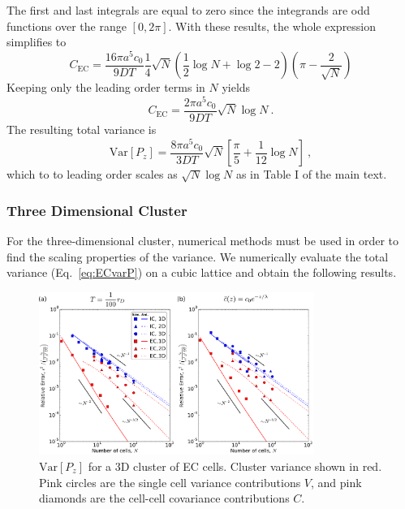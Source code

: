 The first and last integrals are equal to zero since the integrands are odd functions over the range $[0,2\pi]$. With these results, the whole expression simplifies to
\begin{equation}
    C_\text{EC} = \frac{16\pi a^5c_0}{9DT} \frac{1}{4}\sqrt{N} \left( \frac{1}{2}\log N + \log 2 -2 \right) \left( \pi - \frac{2}{\sqrt{N}} \right)
\end{equation}
Keeping only the leading order terms in $N$ yields
\begin{equation}
    C_\text{EC} = \frac{2\pi a^5c_0}{9DT} \sqrt{N} \log N \ .
\end{equation}
The resulting total variance is
\begin{equation}
    \text{Var}[P_z] = \frac{8\pi a^5c_0}{3DT} \sqrt{N} \left[ \frac{\pi}{5} +  \frac{1}{12} \log N \right] \ ,
\end{equation}
which to to leading order scales as $\sqrt{N} \log N$ as in Table I of the main text.


\subsubsection{Three Dimensional Cluster}

For the three-dimensional cluster, numerical methods must be used in order to find the scaling properties of the variance. We numerically evaluate the total variance (Eq.\ \ref{eq:ECvarP}) on a cubic lattice and obtain the following results.

\begin{figure}[ht]
    \centering
        \includegraphics[width=0.8\textwidth]{../fig/ch3_si1.pdf}
    \caption{$\text{Var}[P_z]$ for a 3D cluster of EC cells. Cluster variance shown in red. Pink circles are the single cell variance contributions $V$, and pink diamonds are the cell-cell covariance contributions $C$.} \label{fig:S2}
\end{figure}

